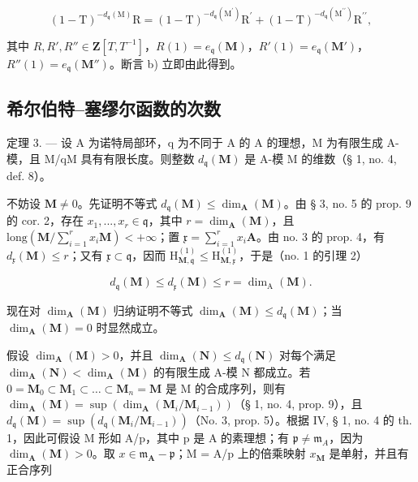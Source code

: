 \[
(1 - \mathrm{T}) ^ {- d _ {\mathfrak {q}} (\mathrm{M})} \mathrm{R} = (1 - \mathrm{T}) ^ {- d _ {\mathfrak {q}} (\mathrm{M} ^ {\prime})} \mathrm{R} ^ {\prime} + (1 - \mathrm{T}) ^ {- d _ {\mathfrak {q}} (\mathrm{M} ^ {\prime \prime})} \mathrm{R} ^ {\prime \prime},
\]

其中 \(R,R',R''\in\mathbf{Z}[T,T^{-1}]\)，\(R(1)=e_{\mathfrak{q}}(\mathbf{M})\)，\(R'(1)=e_{\mathfrak{q}}(\mathbf{M}')\)，\(R''(1)=e_{\mathfrak{q}}(\mathbf{M}'')\)。断言 b) 立即由此得到。

\subsection{希尔伯特–塞缪尔函数的次数}

定理 3. --- 设 A 为诺特局部环，q 为不同于 A 的 A 的理想，M 为有限生成 A-模，且 M/qM 具有有限长度。则整数 \(d_{\mathfrak{q}}(\mathbf{M})\) 是 A-模 M 的维数（§ 1, no. 4, def. 8）。

不妨设 \(\mathbf{M} \neq 0\)。先证明不等式 \(d_{\mathfrak{q}}(\mathbf{M}) \leqslant \dim_{\mathbf{A}}(\mathbf{M})\)。由 § 3, no. 5 的 prop. 9 的 cor. 2，存在 \(x_1, ..., x_r \in \mathfrak{q}\)，其中 \(r = \dim_{\mathbf{A}}(\mathbf{M})\)，且 \(\text{long}(\mathbf{M}/\sum_{i=1}^{r} x_i \mathbf{M}) < +\infty\)；置 \(\mathfrak{x} = \sum_{i=1}^{r} x_i \mathbf{A}\)。由 no. 3 的 prop. 4，有 \(d_{\mathfrak{x}}(\mathbf{M}) \leqslant r\)；又有 \(\mathfrak{x} \subset \mathfrak{q}\)，因而 \(\mathrm{H}_{\mathbf{M},\mathfrak{q}}^{(1)} \leqslant \mathrm{H}_{\mathbf{M},\mathfrak{x}}^{(1)}\)，于是（no. 1 的引理 2）

\[
d _ {\mathfrak{q}} (\mathbf {M}) \leqslant d _ {\mathfrak{x}} (\mathbf {M}) \leqslant r = \dim_ {\mathrm{A}} (\mathbf {M}).
\]

现在对 \(\dim_{\mathbf{A}}(\mathbf{M})\) 归纳证明不等式 \(\dim_{\mathbf{A}}(\mathbf{M}) \leqslant d_{\mathfrak{q}}(\mathbf{M})\)；当 \(\dim_{\mathbf{A}}(\mathbf{M}) = 0\) 时显然成立。

假设 \(\dim_{\mathbf{A}}(\mathbf{M}) > 0\)，并且 \(\dim_{\mathbf{A}}(\mathbf{N}) \leqslant d_{\mathfrak{q}}(\mathbf{N})\) 对每个满足 \(\dim_{\mathbf{A}}(\mathbf{N}) < \dim_{\mathbf{A}}(\mathbf{M})\) 的有限生成 A-模 N 都成立。若 \(0 = \mathbf{M}_0 \subset \mathbf{M}_1 \subset \ldots \subset \mathbf{M}_n = \mathbf{M}\) 是 M 的合成序列，则有 \(\dim_{\mathbf{A}}(\mathbf{M}) = \sup(\dim_{\mathbf{A}}(\mathbf{M}_i / \mathbf{M}_{i-1}))\)（§ 1, no. 4, prop. 9），且 \(d_{\mathfrak{q}}(\mathbf{M}) = \sup(d_{\mathfrak{q}}(\mathbf{M}_i / \mathbf{M}_{i-1}))\)（No. 3, prop. 5）。根据 IV, § 1, no. 4 的 th. 1，因此可假设 M 形如 A/p，其中 p 是 A 的素理想；有 \(\mathfrak{p} \ne \mathfrak{m}_{A}\)，因为 \(\dim_{\mathbf{A}}(\mathbf{M}) > 0\)。取 \(x \in \mathfrak{m}_{\mathbf{A}} - \mathfrak{p}\)；M = A/p 上的倍乘映射 \(x_{\mathbf{M}}\) 是单射，并且有正合序列

